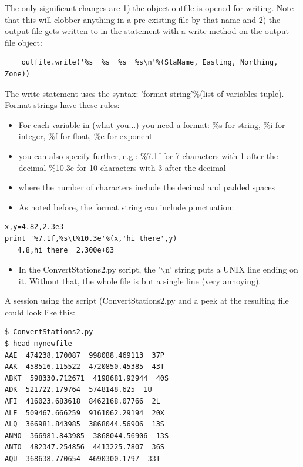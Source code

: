 \documentclass[11pt]{book}
\begin{document}
{{\noindent
The only significant changes are 1) the object {\color{blue}outfile} is opened for writing. Note that this will clobber anything in a pre-existing file by that name and 2) the output file gets written to in the statement with a write method on the output file object:
{ \color{blue} \begin{verbatim}
    outfile.write('%s  %s  %s  %s\n'%(StaName, Easting, Northing, Zone))
\end{verbatim}}
\noindent
The write statement uses the syntax:  'format string'\%(list of variables tuple).  Format strings have these rules:

\begin{itemize}
\item For each variable in (what you...) you need a format:  \%s for string, \%i for integer, \%f for float, \%e for exponent
\item you can also specify further, e.g.:
\%7.1f  for 7 characters with 1 after the decimal
\%10.3e for 10 characters with 3 after the decimal
\item where the number of characters include the decimal and padded spaces
\item As noted before, the format string can include punctuation:
\end{itemize}
{ \color{blue} \begin{verbatim}
x,y=4.82,2.3e3
print '%7.1f,%s\t%10.3e'%(x,'hi there',y)
   4.8,hi there	 2.300e+03
\end{verbatim}}
\begin{itemize}
\item In the {\color{blue}ConvertStations2.py} script, the  '$\backslash$n' string puts a UNIX line ending on it.  Without that, the whole file is but a single line (very annoying).
\end{itemize}




\noindent A session using the script ({\color{blue}ConvertStations2.py} and a peek at the resulting file could look like this:
{ \color{blue} \begin{verbatim}
$ ConvertStations2.py
$ head mynewfile
AAE  474238.170087  998088.469113  37P
AAK  458516.115522  4720850.45385  43T
ABKT  598330.712671  4198681.92944  40S
ADK  521722.179764  5748148.625  1U
AFI  416023.683618  8462168.07766  2L
ALE  509467.666259  9161062.29194  20X
ALQ  366981.843985  3868044.56906  13S
ANMO  366981.843985  3868044.56906  13S
ANTO  482347.254856  4413225.7807  36S
AQU  368638.770654  4690300.1797  33T
\end{verbatim}}

}}
\end{document}
